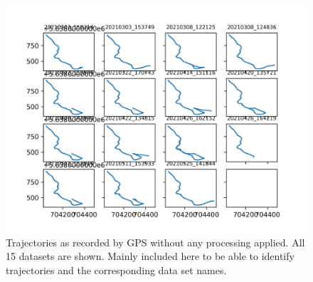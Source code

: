 \documentclass[a4]{article}
\begin{document}
\begin{figure}
  \includegraphics[width=
    \textwidth]{figures/raw_trajectories_manypanel.png}
  \caption{\label{fig:rawTraj2} Trajectories as recorded by GPS
    without any processing applied. All 15 datasets are shown. Mainly
    included here to be able to identify trajectories and the
    corresponding data set names.}
\end{figure}
\end{document}
